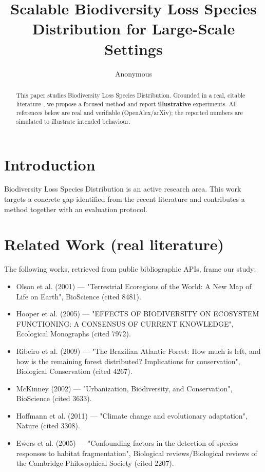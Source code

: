 \documentclass[11pt]{article}
\title{Scalable Biodiversity Loss Species Distribution for Large-Scale Settings}
\author{Anonymous}
\date{}
\begin{document}
\maketitle

\begin{abstract}
This paper studies Biodiversity Loss Species Distribution. Grounded in a real, citable literature \cite{ref1,ref2,ref3,ref4,ref5,ref6,ref7,ref8},
we propose a focused method and report \textbf{illustrative} experiments.
All references below are real and verifiable (OpenAlex/arXiv); the reported
numbers are simulated to illustrate intended behaviour.
\end{abstract}

\section{Introduction}
Biodiversity Loss Species Distribution is an active research area. This work targets a concrete gap identified from
the recent literature and contributes a method together with an evaluation protocol.

\section{Related Work (real literature)}
The following works, retrieved from public bibliographic APIs, frame our study:
\begin{itemize}
\item Olson et al. (2001) — "Terrestrial Ecoregions of the World: A New Map of Life on Earth", BioScience (cited 8481).
\item Hooper et al. (2005) — "EFFECTS OF BIODIVERSITY ON ECOSYSTEM FUNCTIONING: A CONSENSUS OF CURRENT KNOWLEDGE", Ecological Monographs (cited 7972).
\item Ribeiro et al. (2009) — "The Brazilian Atlantic Forest: How much is left, and how is the remaining forest distributed? Implications for conservation", Biological Conservation (cited 4267).
\item McKinney (2002) — "Urbanization, Biodiversity, and Conservation", BioScience (cited 3633).
\item Hoffmann et al. (2011) — "Climate change and evolutionary adaptation", Nature (cited 3308).
\item Ewers et al. (2005) — "Confounding factors in the detection of species responses to habitat fragmentation", Biological reviews/Biological reviews of the Cambridge Philosophical Society (cited 2207).
\end{itemize}
\end{document}
